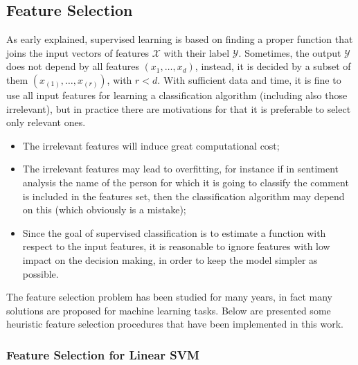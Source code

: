 \subsection{Feature Selection}

As early explained, supervised learning is based on finding a proper function that joins the input vectors of features $\mathcal{X}$ with their label $\mathcal{Y}$. Sometimes, the output $\mathcal{Y}$ does not depend by all features $(x_1, \dots, x_d)$, instead, it is decided by a subset of them $(x_{(1)}, \dots, x_{(r)})$, with $r<d$. With sufficient data and time, it is fine to use all input features for learning a classification algorithm (including also those irrelevant), but in practice there are motivations for that it is preferable to select only relevant ones.\\

\begin{itemize}
	\item The irrelevant features will induce great computational cost;
	\item The irrelevant features may lead to overfitting, for instance if in sentiment analysis the name of the person for which it is going to classify the comment is included in the features set, then the classification algorithm may depend on this (which obviously is a mistake);
	\item Since the goal of supervised classification is to estimate a function with respect to the input features, it is reasonable to ignore features with low impact on the decision making, in order to keep the model simpler as possible.
\end{itemize}

The feature selection problem has been studied for many years, in fact many solutions are proposed for machine learning tasks. Below are presented some heuristic feature selection procedures that have been implemented in this work.


\subsubsection{Feature Selection for Linear SVM}

